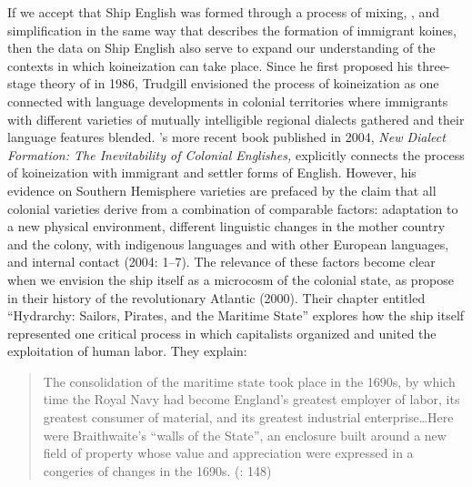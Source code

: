 If we accept that Ship English was formed through a process of  mixing, , and simplification in the same way that \citet{Trudgill1986} describes the formation of immigrant koines, then the data on Ship English also serve to expand our understanding of the contexts in which koineization can take place. Since he first proposed his three-stage theory of  in 1986, Trudgill envisioned the process of koineization as one connected with language developments in colonial territories where immigrants with different varieties of mutually intelligible regional dialects gathered and their language features blended. \citeauthor{Trudgill2004}’s more recent book published in 2004, \textit{New Dialect Formation: The Inevitability of Colonial Englishes,} explicitly connects the process of koineization with immigrant and settler forms of English. However, his evidence on Southern Hemisphere varieties are prefaced by the claim that all colonial varieties derive from a combination of comparable factors: adaptation to a new physical environment, different linguistic changes in the mother country and the colony,  with indigenous languages and with other European languages, and internal  contact (2004: 1–7). The relevance of these factors become clear when we envision the ship itself as a microcosm of the colonial state, as \citeauthor{LinebaughRediker2000} propose in their history of the revolutionary Atlantic (2000). Their chapter entitled “Hydrarchy: Sailors, Pirates, and the Maritime State” explores how the ship itself represented one critical process in which capitalists organized and united the exploitation of human labor. They explain:

\begin{quotation}
The consolidation of the maritime state took place in the 1690s, by which time the Royal Navy had become England’s greatest employer of labor, its greatest consumer of material, and its greatest industrial enterprise…Here were Braithwaite’s “walls of the State”, an enclosure built around a new field of property whose value and appreciation were expressed in a congeries of changes in the 1690s. (\citealt{LinebaughRediker2000}: 148)
\end{quotation}


